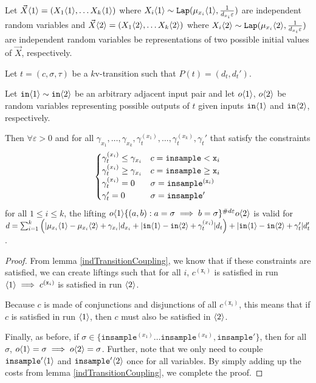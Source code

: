\begin{lemma}\label{mvParallelCouplingsLemma}
    Let $\vec{X}\brangle{1} = (X_1\brangle{1}, \ldots X_k\brangle{1})$ where $X_i\brangle{1}\sim \Lap(\mu_{x_i}\brangle{1}, \frac{1}{d_{x_i}\varepsilon})$ are independent random variables and $\vec{X}\brangle{2} = (X_1\brangle{2}, \ldots X_k\brangle{2})$ where $X_i\brangle{2}\sim \Lap(\mu_{x_i}\brangle{2}, \frac{1}{d_{x_i}\varepsilon})$ are independent random variables be representations of two possible initial values of $\vec{X}$, respectively.

    Let $t = (c, \sigma, \tau)$ be a $k$v-transition such that $P(t) = (d_t, d_t')$.

    Let $\texttt{in}\brangle{1}\sim\texttt{in}\brangle{2}$ be an arbitrary adjacent input pair and let $o\brangle{1}$, $o\brangle{2}$ be random variables representing possible outputs of $t$ given inputs $\texttt{in}\brangle{1}$ and $\texttt{in}\brangle{2}$, respectively. 

    Then $\forall \varepsilon>0$ and for all $\gamma_{x_1}, \ldots, \gamma_{x_k}, \gamma_t^{(x_1)}, \ldots, \gamma_t^{(x_k)}, \gamma_t'$ that satisfy the constraints \[
        \begin{cases}
            \gamma_t^{(x_i)}\leq\gamma_{x_i} & c = \lguard[\texttt{x}_i]\\
            \gamma_t^{(x_i)}\geq\gamma_{x_i} & c = \gguard[\texttt{x}_i]\\
            \gamma_t^{(x_i)}=0 & \sigma = \texttt{insample}^{(\texttt{x}_i)}\\
            \gamma_t'=0 & \sigma = \texttt{insample}'
      \end{cases}
      \] for all $1\leq i\leq k$, the lifting $o\brangle{1}\{(a, b): a=\sigma\implies b=\sigma\}^{\#d\varepsilon}o\brangle{2}$ is valid for 
      $d = \sum_{i=1}^k\left(|\mu_{x_i}\brangle{1}-\mu_{x_i}\brangle{2}+\gamma_{x_i}|d_{x_i}+|\texttt{in}\brangle{1}-\texttt{in}\brangle{2}+\gamma_t^{(x_i)}|d_t\right)+|\texttt{in}\brangle{1}-\texttt{in}\brangle{2}+\gamma_t'|d_t'$.
\end{lemma}
\begin{proof}
    From lemma \ref{indTransitionCoupling}, we know that if these constraints are satisfied, we can create liftings such that for all $i$, $c^{(\texttt{x}_i)}$ is satisfied in run $\brangle{1}\implies c^{(\texttt{x}_i)}$ is satisfied in run $\brangle{2}$.
    
    Because $c$ is made of conjunctions and disjunctions of all $c^{(\texttt{x}_i)}$, this means that if $c$ is satisfied in run $\brangle{1}$, then $c$ must also be satisfied in $\brangle{2}$. 

    Finally, as before, if $\sigma \in \{\texttt{insample}^{(x_1)}\ldots \texttt{insample}^{(x_k)},\texttt{insample}'\}$, then for all $\sigma$, $o\brangle{1}=\sigma \implies o\brangle{2} = \sigma$. Further, note that we only need to couple $\texttt{insample}'\brangle{1}$ and $\texttt{insample}'\brangle{2}$ once for all variables. By simply adding up the costs from lemma \ref{indTransitionCoupling}, we complete the proof.
\end{proof}

